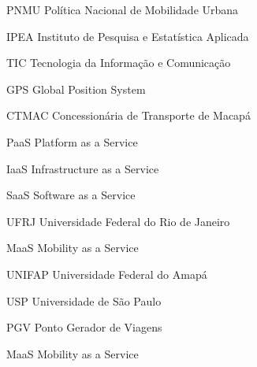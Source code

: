 %
%

\begin{siglas}
    \item[PNMU] Política Nacional de Mobilidade Urbana
    \item[IPEA] Instituto de Pesquisa e Estatística Aplicada
    \item[TIC] Tecnologia da Informação e Comunicação 
    \item[GPS] Global Position System
    \item[CTMAC] Concessionária de Transporte de Macapá
    \item[PaaS] Platform as a Service
    \item[IaaS] Infrastructure as a Service
    \item[SaaS] Software as a Service
    \item[UFRJ] Universidade Federal do Rio de Janeiro
    \item[MaaS] Mobility as a Service
    \item[UNIFAP] Universidade Federal do Amapá
    \item[USP] Universidade de São Paulo
    \item[PGV] Ponto Gerador de Viagens
    \item[MaaS] Mobility as a Service 
\end{siglas}
